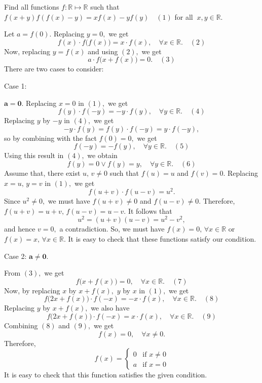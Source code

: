 \begin{solution}
	\begin{tcolorbox}Find all functions $ f : \mathbb{R} \mapsto \mathbb{R}$ such that $ f(x+y)f(f(x)-y)=xf(x)-yf(y)\quad (1)$ for all $ \ x,y \in \mathbb{R}.$\end{tcolorbox}
Let $a=f(0).$ Replacing $y=0,$ we get \[f(x)\cdot f\big(f(x)\big)=x\cdot f(x),\quad \forall x \in \mathbb R. \quad (2)\] Now, replacing $y=f(x)$ and using $(2),$ we get \[a\cdot f\big(x+f(x)\big)=0.\quad (3)\] There are two cases to consider:

\begin{bolded}Case 1: \end{bolded}$\mathbf{a=0}.$ Replacing $x=0$ in $(1),$ we get \[f(y)\cdot f({-y})=-y\cdot f(y),\quad \forall y \in \mathbb R. \quad (4)\] Replacing $y$ by $-y$ in $(4),$ we get \[-y\cdot f(y)=f(y)\cdot f({-y})=y\cdot f({-y}),\] so by combining with the fact $f(0)=0,$ we get \[f({-y})=-f(y),\quad \forall y \in \mathbb R. \quad (5)\] Using this result in $(4),$ we obtain \[f(y)=0\vee f(y)=y,\quad \forall y \in \mathbb R. \quad (6)\] Assume that, there exist $u,\,v \ne 0$ such that $f(u)=u$ and $f(v)=0.$ Replacing $x=u,\,y=v$ in $(1),$ we get \[f(u+v)\cdot f(u-v)=u^2.\] Since $u^2 \ne 0,$ we must have $f(u+v) \ne 0$ and $f(u-v)\ne 0.$ Therefore, $f(u+v)=u+v,\, f(u-v)=u-v.$ It follows that \[u^2=(u+v)(u-v)=u^2-v^2,\] and hence $v=0,$ a contradiction. So, we must have $f(x)=0,\, \forall x \in \mathbb R$ or $f(x)=x,\, \forall x \in \mathbb R.$ It is easy to check that these functions satisfy our condition.

\begin{bolded}Case 2: $\mathbf{ a\ne 0}.$\end{bolded} From $(3),$ we get \[f\big( x+f(x)\big) =0,\quad \forall x \in \mathbb R. \quad (7)\] Now, by replacing $x$ by $x+f(x),$ $y$ by $x$ in $(1),$ we get \[f\big(2x+f(x)\big)\cdot f({-x})=-x\cdot f(x),\quad \forall x \in \mathbb R. \quad (8)\] Replacing $y$ by $x+ f(x),$ we also have \[f\big( 2x+f(x)\big)\cdot f({-x})=x\cdot f(x),\quad \forall x \in \mathbb R. \quad (9)\] Combining $(8)$ and $(9),$ we get \[f(x)=0,\quad \forall x \ne 0.\] Therefore, \[f(x)=\begin{cases} 0 &\text{if } x \ne 0 \\ a &\text{if } x =0 \end{cases}\] It is easy to check that this function satisfies the given condition.
\end{solution}



